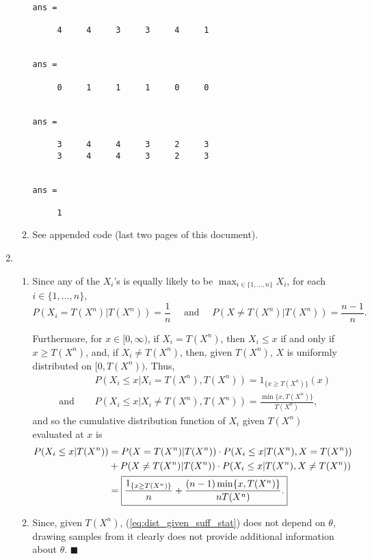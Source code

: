 \documentclass[11pt]{article}
\renewcommand{\qed}{\quad \ensuremath{\blacksquare}}
\begin{document}
\begin{enumerate}
\begin{enumerate}
\begin{verbatim}
ans =

     4     4     3     3     4     1


ans =

     0     1     1     1     0     0


ans =

     3     4     4     3     2     3
     3     4     4     3     2     3


ans =

     1

\end{verbatim}

\item See appended code (last two pages of this document).

\end{enumerate}

\newpage
\item
\begin{enumerate}
\item Since any of the $X_i$'s is equally likely to be
$\max_{i \in \{1,\dots,n\}} X_i$, for each $i \in \{1,\dots,n\}$,
\[P(X_i = T(X^n) | T(X^n)) = \frac{1}{n}
    \quad \mbox{ and } \quad
    P(X \neq T(X^n) | T(X^n)) = \frac{n - 1}{n}.\]

Furthermore, for $x \in [0,\infty)$, if $X_i = T(X^n)$, then
$X_i \leq x$ if and only if $x \geq T(X^n)$, and, if $X_i \neq T(X^n)$, then,
given $T(X^n)$, $X$ is uniformly distributed on $[0,T(X^n))$. Thus,
\begin{align*}
 &  P(X_i \leq x | X_i = T(X^n), T(X^n)) = 1_{\{x \geq T(X^n)\}}(x) \\
    \quad \mbox{ and } \quad
 &  P(X_i \leq x | X_i \neq T(X^n), T(X^n))
                                        = \frac{\min\{x,T(X^n)\}}{T(X^n)},
\end{align*}
and so the cumulative distribution function of $X_i$ given $T(X^n)$ evaluated
at $x$ is
\begin{align}
\notag
P(X_i \leq x| T(X^n))
 &  = P(X = T(X^n) | T(X^n)) \cdot P(X_i \leq x | T(X^n), X = T(X^n))       \\
\notag
 &  + P(X \neq T(X^n) | T(X^n)) \cdot P(X_i \leq x| T(X^n), X \neq T(X^n))  \\
\label{eq:dist_given_suff_stat}
 &  = \mbox{\fbox{$\displaystyle \frac{1_{\{x \geq T(X^n)\}}}{n}
                                + \frac{(n - 1)\min\{x,T(X^n)\}}{nT(X^n)}$.}}
\end{align}

\item Since, given $T(X^n)$, (\ref{eq:dist_given_suff_stat}) does not depend on
$\theta$, drawing samples from it clearly does not provide additional
information about $\theta$. \qed
\end{enumerate}
\end{enumerate}
\end{document}
